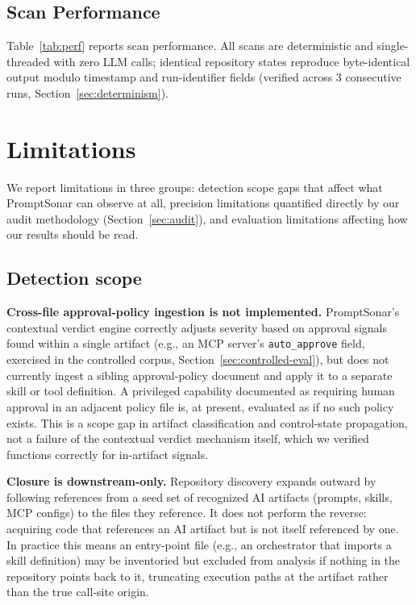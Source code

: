 \documentclass[sigconf,anonymous,review]{acmart}
\newcommand{\sysname}{PromptSonar}
\begin{document}
\subsection{Scan Performance}
\label{sec:perf}
Table~\ref{tab:perf} reports scan performance. All scans are deterministic and single-threaded with zero LLM calls; identical repository states reproduce byte-identical output modulo timestamp and run-identifier fields (verified across 3 consecutive runs, Section~\ref{sec:determinism}).



\section{Limitations}
\label{sec:limitations}
We report limitations in three groups: detection scope gaps that affect what \sysname{} can observe at all, precision limitations quantified directly by our audit methodology (Section~\ref{sec:audit}), and evaluation limitations affecting how our results should be read.

\subsection{Detection scope}
\label{sec:scope-limits}
\textbf{Cross-file approval-policy ingestion is not implemented.} \sysname{}'s contextual verdict engine correctly adjusts severity based on approval signals found within a single artifact (e.g., an MCP server's \texttt{auto\_approve} field, exercised in the controlled corpus, Section~\ref{sec:controlled-eval}), but does not currently ingest a sibling approval-policy document and apply it to a separate skill or tool definition. A privileged capability documented as requiring human approval in an adjacent policy file is, at present, evaluated as if no such policy exists. This is a scope gap in artifact classification and control-state propagation, not a failure of the contextual verdict mechanism itself, which we verified functions correctly for in-artifact signals.

\textbf{Closure is downstream-only.} Repository discovery expands outward by following references from a seed set of recognized AI artifacts (prompts, skills, MCP configs) to the files they reference. It does not perform the reverse: acquiring code that references an AI artifact but is not itself referenced by one. In practice this means an entry-point file (e.g., an orchestrator that imports a skill definition) may be inventoried but excluded from analysis if nothing in the repository points back to it, truncating execution paths at the artifact rather than the true call-site origin.
\end{document}
